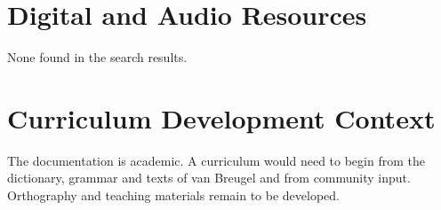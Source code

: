 \documentclass[12pt]{article}
\begin{document}
\section{Digital and Audio Resources}
None found in the search results.

\section{Curriculum Development Context}
The documentation is academic. A curriculum would need to begin from the dictionary, grammar and texts of van Breugel and from community input. Orthography and teaching materials remain to be developed.
\end{document}
